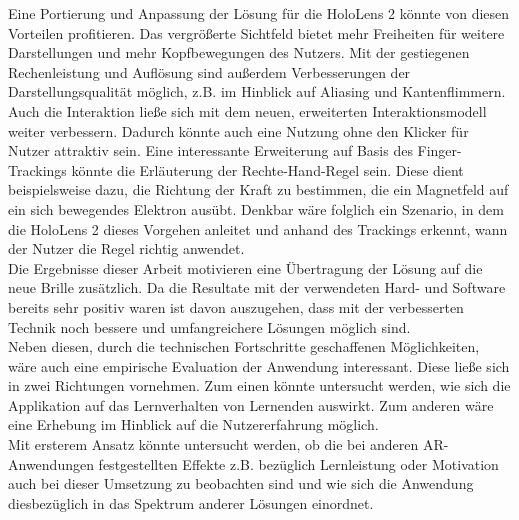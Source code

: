 Eine Portierung und Anpassung der Lösung für die HoloLens 2 könnte von diesen Vorteilen profitieren. Das vergrößerte Sichtfeld bietet mehr Freiheiten für weitere Darstellungen und mehr Kopfbewegungen des Nutzers. Mit der gestiegenen Rechenleistung und Auflösung sind außerdem Verbesserungen der Darstellungsqualität möglich, z.B. im Hinblick auf Aliasing und Kantenflimmern. Auch die Interaktion ließe sich mit dem neuen, erweiterten Interaktionsmodell weiter verbessern. Dadurch könnte auch eine Nutzung ohne den Klicker für Nutzer attraktiv sein.
\noindent\hspace*{5mm}
Eine interessante Erweiterung auf Basis des Finger-Trackings könnte die Erläuterung der Rechte-Hand-Regel sein. Diese dient beispielsweise dazu, die Richtung der Kraft zu bestimmen, die ein Magnetfeld auf ein sich bewegendes Elektron ausübt. Denkbar wäre folglich ein Szenario, in dem die HoloLens 2 dieses Vorgehen anleitet und anhand des Trackings erkennt, wann der Nutzer die Regel richtig anwendet.\\

Die Ergebnisse dieser Arbeit motivieren eine Übertragung der Lösung auf die neue Brille zusätzlich. Da die Resultate mit der verwendeten Hard- und Software bereits sehr positiv waren ist davon auszugehen, dass mit der verbesserten Technik noch bessere und umfangreichere Lösungen möglich sind.\\

Neben diesen, durch die technischen Fortschritte geschaffenen Möglichkeiten, wäre auch eine empirische Evaluation der Anwendung interessant. Diese ließe sich in zwei Richtungen vornehmen. Zum einen könnte untersucht werden, wie sich die Applikation auf das Lernverhalten von Lernenden auswirkt. Zum anderen wäre eine Erhebung im Hinblick auf die Nutzererfahrung möglich.\\
\noindent\hspace*{5mm}
Mit ersterem Ansatz könnte untersucht werden, ob die bei anderen AR-Anwendungen festgestellten Effekte z.B. bezüglich Lernleistung oder Motivation auch bei dieser Umsetzung zu beobachten sind und wie sich die Anwendung diesbezüglich in das Spektrum anderer Lösungen einordnet.
